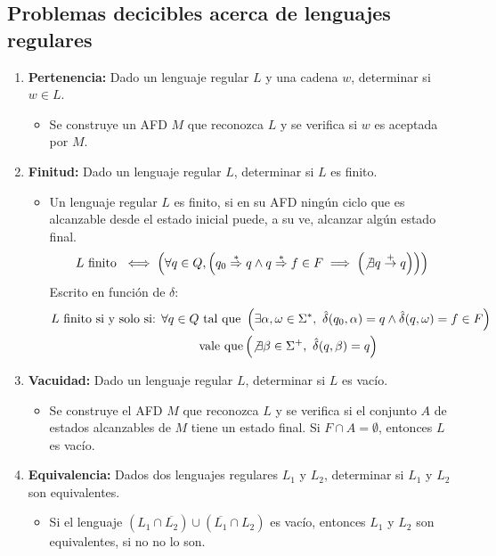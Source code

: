 \subsection{Problemas decicibles acerca de lenguajes regulares}
\begin{enumerate}
  \item \textbf{Pertenencia:} Dado un lenguaje regular \(L\) y una cadena \(w\), determinar si \(w\in L\).
        \begin{itemize}
          \item[] Se construye un AFD \(M\) que reconozca \(L\) y se verifica si \(w\) es aceptada por \(M\).
        \end{itemize}
  \item \textbf{Finitud:} Dado un lenguaje regular \(L\), determinar si \(L\) es finito.
        \begin{itemize}
          \item[] Un lenguaje regular \(L\) es finito, si en su AFD ningún ciclo que es alcanzable desde el estado inicial puede, a su ve, alcanzar algún estado final.
            \[
              L \text{ finito } \iff \left(
              \forall q \in Q,\left(
                q_0 \overset{*}{\Rightarrow} q \land q \overset{*}{\Rightarrow} f \in F \implies \left(\not\exists q\overset{+}{\rightarrow} q\right)
                \right)
              \right)\]
            Escrito en función de \(\delta\):
            \begin{align*}
              L \text{ finito si y solo si: } \forall q \in Q & \text{ tal que } \left(
              \exists\alpha,\omega\in\Sigma^*,~\hat\delta(q_0, \alpha) = q \land \hat\delta(q, \omega) = f \in F
              \right)                                                                   \\ &\text{vale que} \left(\not\exists\beta\in\Sigma^+,~\hat\delta(q, \beta) = q\right)
            \end{align*}
        \end{itemize}
  \item \textbf{Vacuidad:} Dado un lenguaje regular \(L\), determinar si \(L\) es vacío.
        \begin{itemize}
          \item[] Se construye el AFD \(M\) que reconozca \(L\) y se verifica si el conjunto \(A\) de estados alcanzables de \(M\) tiene un estado final. Si \(F\cap A = \emptyset\), entonces \(L\) es vacío.
        \end{itemize}
  \item \textbf{Equivalencia:} Dados dos lenguajes regulares \(L_1\) y \(L_2\), determinar si \(L_1\) y \(L_2\) son equivalentes.
        \begin{itemize}
          \item[] Si el lenguaje \( (L_1 \cap \overline{L_2}) \cup (\overline{L_1}\cap L_2) \) es vacío, entonces \(L_1\) y \(L_2\) son equivalentes, si no no lo son.
        \end{itemize}
\end{enumerate}
